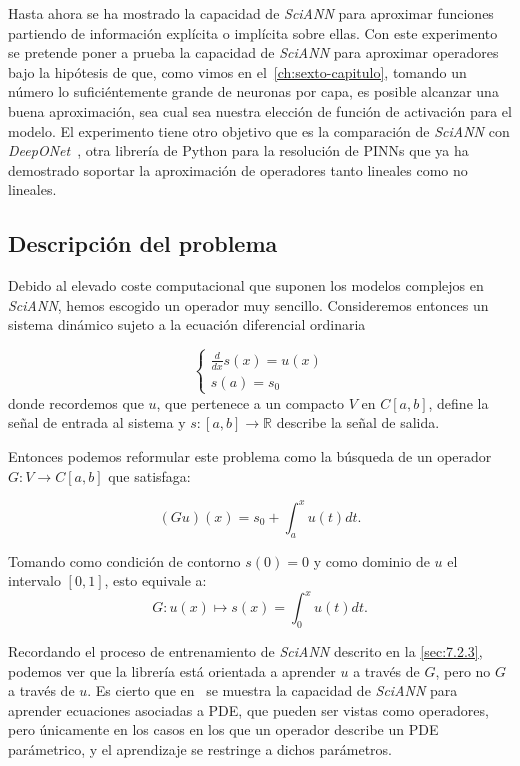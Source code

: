 Hasta ahora se ha mostrado la capacidad de \textit{SciANN} para aproximar funciones partiendo de información explícita o implícita sobre ellas. Con este experimento se pretende poner a prueba la capacidad de \textit{SciANN} para aproximar operadores bajo la hipótesis de que, como vimos en el~\autoref{ch:sexto-capitulo}, tomando un número lo suficiéntemente grande de neuronas por capa, es posible alcanzar una buena aproximación, sea cual sea nuestra elección de función de activación para el modelo. El experimento tiene otro objetivo que es la comparación de \textit{SciANN} con \textit{DeepONet}~\cite{lu2024deeponet}, otra librería de Python para la resolución de PINNs que ya ha demostrado soportar la aproximación de operadores tanto lineales como no lineales. 

\subsection{Descripción del problema}\label{sec:8.3.2}

Debido al elevado coste computacional que suponen los modelos complejos en \textit{SciANN}, hemos escogido un operador muy sencillo. Consideremos entonces un sistema dinámico sujeto a la ecuación diferencial ordinaria

\begin{equation}
    \begin{cases}
        \frac{d}{dx}s(x) = u(x) \\
        s(a) = s_{0}
    \end{cases}
\end{equation}
donde recordemos que $u$, que pertenece a un compacto $V$ en $C[a,b]$, define la señal de entrada al sistema y $s:[a,b]\rightarrow \mathds{R}$ describe la señal de salida.

Entonces podemos reformular este problema como la búsqueda de un operador $G:V\rightarrow C[a,b]$ que satisfaga: 

\begin{equation}
    (Gu)(x) = s_{0} + \int_{a}^{x} u(t)dt.
\end{equation}

Tomando como condición de contorno $s(0)=0$ y como dominio de $u$ el intervalo $[0,1]$, esto equivale a:
\begin{equation}
    G:u(x) \mapsto s(x) = \int_{0}^{x}u(t)dt.
\end{equation}

Recordando el proceso de entrenamiento de \textit{SciANN} descrito en la \autoref{sec:7.2.3}, podemos ver que la librería está orientada a aprender $u$ a través de $G$, pero no $G$ a través de $u$. Es cierto que en~\cite{Haghighat2021} se muestra la capacidad de \textit{SciANN} para aprender ecuaciones asociadas a PDE, que pueden ser vistas como operadores, pero únicamente en los casos en los que un operador describe un PDE parámetrico, y el aprendizaje se restringe a dichos parámetros. 


